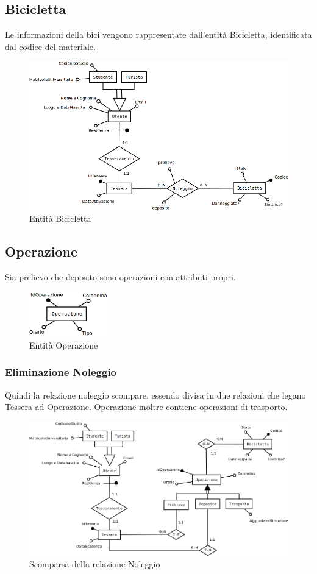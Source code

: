 \documentclass[a4paper,twoside]{article}
\begin{document}
\subsection{Bicicletta}
Le informazioni della bici vengono rappresentate dall'entità Bicicletta, identificata dal codice del materiale.
\begin{figure}[H]
 \centering
  \includegraphics[width=1\textwidth]{Concettuale05}
\caption{Entità Bicicletta}
\end{figure}
\subsection{Operazione}
Sia prelievo che deposito sono operazioni con attributi propri.
\begin{figure}[H]
 \centering
  \includegraphics[width=0.3\textwidth]{Concettuale06}
\caption{Entità Operazione}
\end{figure}
\subsubsection{Eliminazione Noleggio}
Quindi la relazione noleggio scompare, essendo divisa in due relazioni che legano Tessera ad Operazione. Operazione inoltre contiene operazioni di trasporto.
\begin{figure}[H]
 \centering
  \includegraphics[width=1\textwidth]{Concettuale07}
\caption{Scomparsa della relazione Noleggio}
\end{figure}
\end{document}
